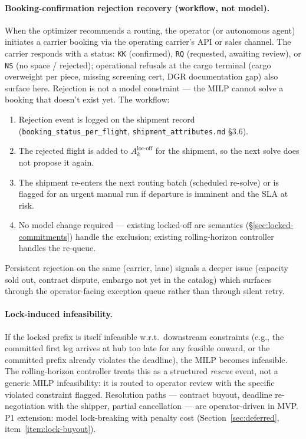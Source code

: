 \documentclass[11pt,a4paper]{article}
\theoremstyle{definition}
\begin{document}
\paragraph{Booking-confirmation rejection recovery (workflow, not model).}
When the optimizer recommends a routing, the operator (or autonomous agent) initiates
a carrier booking via the operating carrier's API or sales channel. The carrier
responds with a status: \texttt{KK} (confirmed), \texttt{RQ} (requested, awaiting
review), or \texttt{NS} (no space / rejected); operational refusals at the cargo
terminal (cargo overweight per piece, missing screening cert, DGR documentation gap)
also surface here. Rejection is not a model constraint --- the MILP cannot solve a
booking that doesn't exist yet. The workflow:
\begin{enumerate}[noitemsep]
  \item Rejection event is logged on the shipment record (\texttt{booking\_status\_per\_flight}, \texttt{shipment\_attributes.md} \S3.6).
  \item The rejected flight is added to $A_k^{\text{loc-off}}$ for the shipment, so the
        next solve does not propose it again.
  \item The shipment re-enters the next routing batch (scheduled re-solve) or is
        flagged for an urgent manual run if departure is imminent and the SLA at risk.
  \item No model change required --- existing locked-off arc semantics
        (\S\ref{sec:locked-commitments}) handle the exclusion; existing rolling-horizon
        controller handles the re-queue.
\end{enumerate}
Persistent rejection on the same (carrier, lane) signals a deeper issue (capacity
sold out, contract dispute, embargo not yet in the catalog) which surfaces through the
operator-facing exception queue rather than through silent retry.

\paragraph{Lock-induced infeasibility.}
If the locked prefix is itself infeasible w.r.t.\ downstream constraints (e.g., the
committed first leg arrives at hub too late for any feasible onward, or the committed
prefix already violates the deadline), the MILP becomes infeasible. The
rolling-horizon controller treats this as a structured \emph{rescue} event, not a
generic MILP infeasibility: it is routed to operator review with the specific
violated constraint flagged. Resolution paths --- contract buyout, deadline
re-negotiation with the shipper, partial cancellation --- are operator-driven in
MVP. P1 extension: model lock-breaking with penalty cost (Section~\ref{sec:deferred},
item~\ref{item:lock-buyout}).
\end{document}
